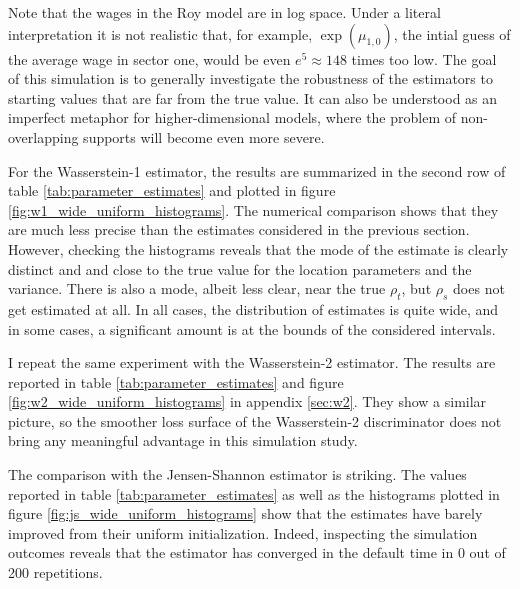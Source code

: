 Note that the wages in the Roy model are in log space. 
Under a literal interpretation it is not realistic that, for example, $\exp(\mu_{1,0})$, the intial guess of the average wage in sector one, would be even $e^5 \approx 148$ times too low.
The goal of this simulation is to generally investigate the robustness of the estimators to starting values that are far from the true value.
It can also be understood as an imperfect metaphor for higher-dimensional models, where the problem of non-overlapping supports will become even more severe.

For the Wasserstein-1 estimator, the results are summarized in the second row of table \ref{tab:parameter_estimates} and plotted in figure \ref{fig:w1_wide_uniform_histograms}.
The numerical comparison shows that they are much less precise than the estimates considered in the previous section.
However, checking the histograms reveals that the mode of the estimate is clearly distinct and and close to the true value for the location parameters and the variance.
There is also a mode, albeit less clear, near the true $\rho_t$, but $\rho_s$ does not get estimated at all.
In all cases, the distribution of estimates is quite wide, and in some cases, a significant amount is at the bounds of the considered intervals.

I repeat the same experiment with the Wasserstein-2 estimator.
The results are reported in table \ref{tab:parameter_estimates} and figure \ref{fig:w2_wide_uniform_histograms} in appendix \ref{sec:w2}.
They show a similar picture, so the smoother loss surface of the Wasserstein-2 discriminator does not bring any meaningful advantage in this simulation study. %

The comparison with the Jensen-Shannon estimator is striking.
The values reported in table \ref{tab:parameter_estimates} as well as the histograms plotted in figure \ref{fig:js_wide_uniform_histograms} show that the estimates have barely improved from their uniform initialization.
Indeed, inspecting the simulation outcomes reveals that the estimator has converged in the default time in 0 out of 200 repetitions. %

